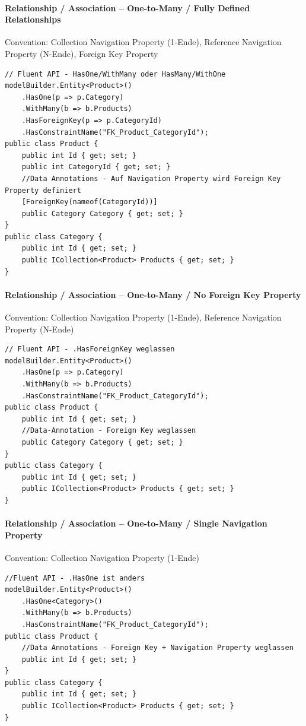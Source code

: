 \documentclass[
a4paper,
oneside,
10pt,
fleqn,
headsepline,
toc=listofnumbered, 
bibliography=totocnumbered]{scrartcl}
\begin{document}
\paragraph{Relationship / Association – One-to-Many / Fully Defined Relationships} 
Convention: Collection Navigation Property (1-Ende), Reference Navigation Property (N-Ende), Foreign Key Property
\begin{lstlisting}
// Fluent API - HasOne/WithMany oder HasMany/WithOne
modelBuilder.Entity<Product>()
    .HasOne(p => p.Category)                            
    .WithMany(b => b.Products)
    .HasForeignKey(p => p.CategoryId)
    .HasConstraintName("FK_Product_CategoryId");
public class Product {
    public int Id { get; set; }
    public int CategoryId { get; set; }
    //Data Annotations - Auf Navigation Property wird Foreign Key Property definiert
    [ForeignKey(nameof(CategoryId))]                        
    public Category Category { get; set; }
}
public class Category {
    public int Id { get; set; }
    public ICollection<Product> Products { get; set; }
}
\end{lstlisting}

\paragraph{Relationship / Association – One-to-Many / No Foreign Key Property} 
Convention: Collection Navigation Property (1-Ende), Reference Navigation Property (N-Ende)
\begin{lstlisting}
// Fluent API - .HasForeignKey weglassen
modelBuilder.Entity<Product>()
    .HasOne(p => p.Category)
    .WithMany(b => b.Products)                          
    .HasConstraintName("FK_Product_CategoryId");
public class Product {
    public int Id { get; set; }
    //Data-Annotation - Foreign Key weglassen
    public Category Category { get; set; }              
}
public class Category {
    public int Id { get; set; }
    public ICollection<Product> Products { get; set; }
}
\end{lstlisting}

\paragraph{Relationship / Association – One-to-Many / Single Navigation Property} Convention: Collection Navigation Property (1-Ende)
\begin{lstlisting}
//Fluent API - .HasOne ist anders
modelBuilder.Entity<Product>()
    .HasOne<Category>()
    .WithMany(b => b.Products)
    .HasConstraintName("FK_Product_CategoryId");
public class Product {
    //Data Annotations - Foreign Key + Navigation Property weglassen
    public int Id { get; set; }                         
}
public class Category {
    public int Id { get; set; }
    public ICollection<Product> Products { get; set; }
}
\end{lstlisting}
\end{document}
